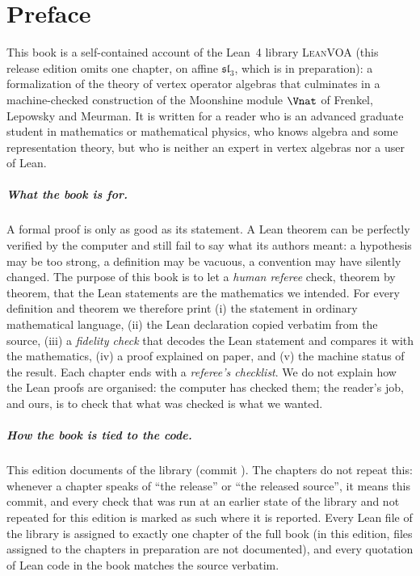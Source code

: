 \chapter*{Preface}
This book is a self-contained account of the Lean~4 library \textsc{LeanVOA} (this release edition
omits one chapter, on affine $\mathfrak{sl}_3$, which is in preparation): a
formalization of the theory of vertex operator algebras that culminates in a machine-checked
construction of the Moonshine module $\Vnat$ of Frenkel, Lepowsky and Meurman. It is written for a
reader who is an advanced graduate student in mathematics or mathematical physics, who knows
algebra and some representation theory, but who is neither an expert in vertex algebras nor a
user of Lean.

\paragraph{What the book is for.} A formal proof is only as good as its statement. A Lean theorem
can be perfectly verified by the computer and still fail to say what its authors meant: a
hypothesis may be too strong, a definition may be vacuous, a convention may have silently changed.
The purpose of this book is to let a \emph{human referee} check, theorem by theorem, that the Lean
statements are the mathematics we intended. For every definition and theorem we therefore print
(i) the statement in ordinary mathematical language, (ii) the Lean declaration copied verbatim
from the source, (iii) a \emph{fidelity check} that decodes the Lean statement and compares it with
the mathematics, (iv) a proof explained on paper, and (v) the machine status of the result. Each
chapter ends with a \emph{referee's checklist}. We do not explain how the Lean proofs are
organised: the computer has checked them; the reader's job, and ours, is to check that what was
checked is what we wanted.

\paragraph{How the book is tied to the code.} This edition documents \bookrelease{} of the library (commit
\texttt{\bookcommit}). The chapters do not repeat this: whenever a chapter speaks of ``the release'' or ``the released
source'', it means this commit, and every check that was run at an earlier state of the library and not repeated for this
edition is marked as such where it is reported. Every Lean file of the library is assigned to exactly one chapter of the full book (in this
edition, files assigned to the chapters in preparation are not documented), and every quotation of Lean
code in the book matches the source verbatim.

